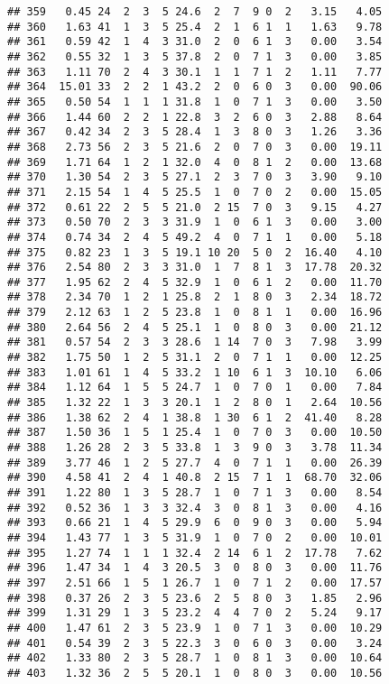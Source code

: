 \documentclass[
]{article}
\begin{document}
\begin{verbatim}
## 359   0.45 24  2  3  5 24.6  2  7  9 0  2   3.15   4.05
## 360   1.63 41  1  3  5 25.4  2  1  6 1  1   1.63   9.78
## 361   0.59 42  1  4  3 31.0  2  0  6 1  3   0.00   3.54
## 362   0.55 32  1  3  5 37.8  2  0  7 1  3   0.00   3.85
## 363   1.11 70  2  4  3 30.1  1  1  7 1  2   1.11   7.77
## 364  15.01 33  2  2  1 43.2  2  0  6 0  3   0.00  90.06
## 365   0.50 54  1  1  1 31.8  1  0  7 1  3   0.00   3.50
## 366   1.44 60  2  2  1 22.8  3  2  6 0  3   2.88   8.64
## 367   0.42 34  2  3  5 28.4  1  3  8 0  3   1.26   3.36
## 368   2.73 56  2  3  5 21.6  2  0  7 0  3   0.00  19.11
## 369   1.71 64  1  2  1 32.0  4  0  8 1  2   0.00  13.68
## 370   1.30 54  2  3  5 27.1  2  3  7 0  3   3.90   9.10
## 371   2.15 54  1  4  5 25.5  1  0  7 0  2   0.00  15.05
## 372   0.61 22  2  5  5 21.0  2 15  7 0  3   9.15   4.27
## 373   0.50 70  2  3  3 31.9  1  0  6 1  3   0.00   3.00
## 374   0.74 34  2  4  5 49.2  4  0  7 1  1   0.00   5.18
## 375   0.82 23  1  3  5 19.1 10 20  5 0  2  16.40   4.10
## 376   2.54 80  2  3  3 31.0  1  7  8 1  3  17.78  20.32
## 377   1.95 62  2  4  5 32.9  1  0  6 1  2   0.00  11.70
## 378   2.34 70  1  2  1 25.8  2  1  8 0  3   2.34  18.72
## 379   2.12 63  1  2  5 23.8  1  0  8 1  1   0.00  16.96
## 380   2.64 56  2  4  5 25.1  1  0  8 0  3   0.00  21.12
## 381   0.57 54  2  3  3 28.6  1 14  7 0  3   7.98   3.99
## 382   1.75 50  1  2  5 31.1  2  0  7 1  1   0.00  12.25
## 383   1.01 61  1  4  5 33.2  1 10  6 1  3  10.10   6.06
## 384   1.12 64  1  5  5 24.7  1  0  7 0  1   0.00   7.84
## 385   1.32 22  1  3  3 20.1  1  2  8 0  1   2.64  10.56
## 386   1.38 62  2  4  1 38.8  1 30  6 1  2  41.40   8.28
## 387   1.50 36  1  5  1 25.4  1  0  7 0  3   0.00  10.50
## 388   1.26 28  2  3  5 33.8  1  3  9 0  3   3.78  11.34
## 389   3.77 46  1  2  5 27.7  4  0  7 1  1   0.00  26.39
## 390   4.58 41  2  4  1 40.8  2 15  7 1  1  68.70  32.06
## 391   1.22 80  1  3  5 28.7  1  0  7 1  3   0.00   8.54
## 392   0.52 36  1  3  3 32.4  3  0  8 1  3   0.00   4.16
## 393   0.66 21  1  4  5 29.9  6  0  9 0  3   0.00   5.94
## 394   1.43 77  1  3  5 31.9  1  0  7 0  2   0.00  10.01
## 395   1.27 74  1  1  1 32.4  2 14  6 1  2  17.78   7.62
## 396   1.47 34  1  4  3 20.5  3  0  8 0  3   0.00  11.76
## 397   2.51 66  1  5  1 26.7  1  0  7 1  2   0.00  17.57
## 398   0.37 26  2  3  5 23.6  2  5  8 0  3   1.85   2.96
## 399   1.31 29  1  3  5 23.2  4  4  7 0  2   5.24   9.17
## 400   1.47 61  2  3  5 23.9  1  0  7 1  3   0.00  10.29
## 401   0.54 39  2  3  5 22.3  3  0  6 0  3   0.00   3.24
## 402   1.33 80  2  3  5 28.7  1  0  8 1  3   0.00  10.64
## 403   1.32 36  2  5  5 20.1  1  0  8 0  3   0.00  10.56

\end{verbatim}
\end{document}
